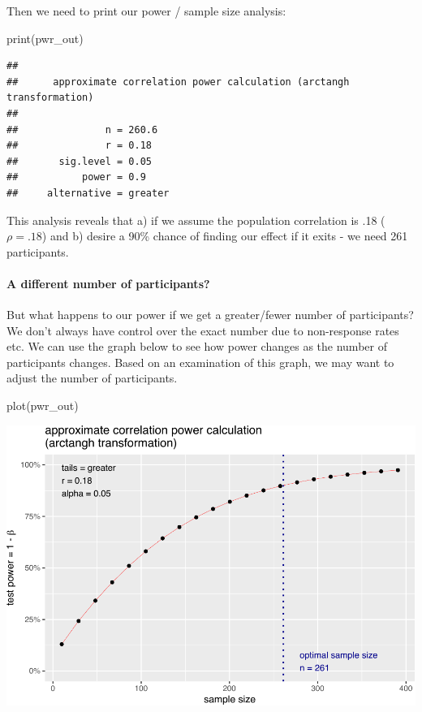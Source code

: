 \documentclass[
]{krantz}
\makeatletter
\newenvironment{Shaded}{\begin{snugshade}}{\end{snugshade}}
\newcommand{\FunctionTok}[1]{\textcolor[rgb]{0,0,0}{#1}}
\newcommand{\NormalTok}[1]{#1}
\newenvironment{kframe}{%
\medskip{}
\setlength{\fboxsep}{.8em}
 \def\at@end@of@kframe{}%
 \ifinner\ifhmode%
  \def\at@end@of@kframe{\end{minipage}}%
  \begin{minipage}{\columnwidth}%
 \fi\fi%
 \def\FrameCommand##1{\hskip\@totalleftmargin \hskip-\fboxsep
 \colorbox{shadecolor}{##1}\hskip-\fboxsep
     \hskip-\linewidth \hskip-\@totalleftmargin \hskip\columnwidth}%
 \MakeFramed {\advance\hsize-\width
   \@totalleftmargin\z@ \linewidth\hsize
   \@setminipage}}%
 {\par\unskip\endMakeFramed%
 \at@end@of@kframe}
\renewenvironment{Shaded}{\begin{kframe}}{\end{kframe}}
\makeatother
\begin{document}
Then we need to print our power / sample size analysis:

\begin{Shaded}
\begin{Highlighting}[]
\FunctionTok{print}\NormalTok{(pwr\_out)}
\end{Highlighting}
\end{Shaded}

\begin{verbatim}
## 
##      approximate correlation power calculation (arctangh transformation) 
## 
##               n = 260.6
##               r = 0.18
##       sig.level = 0.05
##           power = 0.9
##     alternative = greater
\end{verbatim}

This analysis reveals that a) if we assume the population correlation is .18 (\(\rho = .18\)) and b) desire a 90\% chance of finding our effect if it exits - we need 261 participants.

\hypertarget{a-different-number-of-participants-2}{%
\paragraph{A different number of participants?}\label{a-different-number-of-participants-2}}

But what happens to our power if we get a greater/fewer number of participants? We don't always have control over the exact number due to non-response rates etc. We can use the graph below to see how power changes as the number of participants changes. Based on an examination of this graph, we may want to adjust the number of participants.

\begin{Shaded}
\begin{Highlighting}[]
\FunctionTok{plot}\NormalTok{(pwr\_out)}
\end{Highlighting}
\end{Shaded}

\includegraphics{bookdown_files/figure-latex/unnamed-chunk-362-1.pdf}
\end{document}
